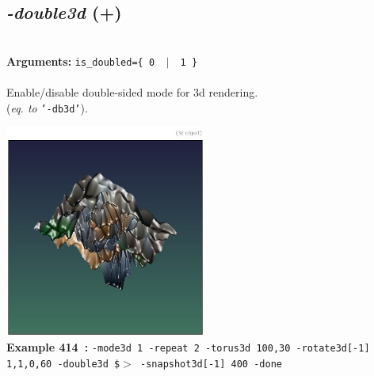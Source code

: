 \documentclass[a4paper,11pt,twoside]{book}
\begin{document}
\subsection{\emph{-double3d} (+)}\vspace*{-0.5em}
~\\\textbf{Arguments: } 
{\small \texttt{is\_doubled=\{ 0 ~$|$~ 1 \}}}\\~\\
Enable/disable double-sided mode for 3d rendering.
~\\(\emph{eq. to} {\small \texttt{'-db3d'}}).
\begin{center}\includegraphics[keepaspectratio=true,height=7cm,width=\textwidth]{img/gmic_def414.jpg}\\
{\footnotesize \textbf{Example 414~:} \texttt{-mode3d 1 -repeat 2 -torus3d 100,30 -rotate3d[-1] 1,1,0,60 -double3d \$$>$ -snapshot3d[-1] 400 -done}}
\end{center}
\end{document}
